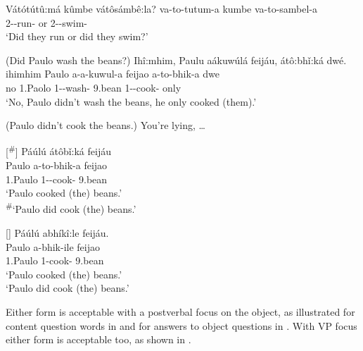 \documentclass[output=paper]{langscibook}
\begin{document}
\z

\ea
\label{bkm:Ref127267346}
{Vátótútû:má kûmbe vátôsámbê:la?  }
\gll
va-to-tutum-a  kumbe  va-to-sambel-a\\
2\SM{}-\TO{}-run-\FV{}  or  2\SM{}-\TO{}-swim-\FV{}\\
\glt
‘Did they run or did they swim?’\\

\z

\ea
\label{bkm:Ref127267428}
(Did Paulo wash the beans?) 
Ihî:mhim, Paulu aákuwúlá feijáu, átô:bhǐ:ká dwé.\\
\gll
ihimhim  Paulo  a-a-kuwul-a  feijao  a-to-bhik-a  dwe\\
no  1.Paolo  1\SM{}-\NEG{}-wash-\FV{}  9.bean  1\SM{}-\TO{}-cook-\FV{}  only\\
\glt
‘No, Paulo didn’t wash the beans, he only cooked (them).’\\

\z

\ea\label{bkm:Ref141371619}(Paulo didn’t cook the beans.) You’re lying, …  \jambox*{[verum]}

\ea
[\textsuperscript{\#}]{
\label{bkm:Ref141371619:a}
Páúlú átôbǐ:ká feijáu\\
\gll
Paulo  a-to-bhik-a  feijao\\
1.Paulo  1\SM{}-\TO{}-cook-\FV{}  9.bean\\
\glt
‘Paulo cooked (the) beans.’\\
\textsuperscript{\#}`Paulo did cook (the) beans.’
}


\ex
[]{
\label{bkm:Ref141371619:b}
Páúlú abhíkî:le feijáu.\\
\gll
Paulo  a-bhik-ile  feijao\\
1.Paulo  1\SM{}-cook-\PFV{}  9.bean\\
\glt
‘Paulo cooked (the) beans.’\\
‘Paulo did cook (the) beans.’
}

\z
\z

Either form is acceptable with a postverbal focus on the object, as illustrated for content question words in  and for answers to object questions in . With VP focus either form is acceptable too, as shown in .
\end{document}
